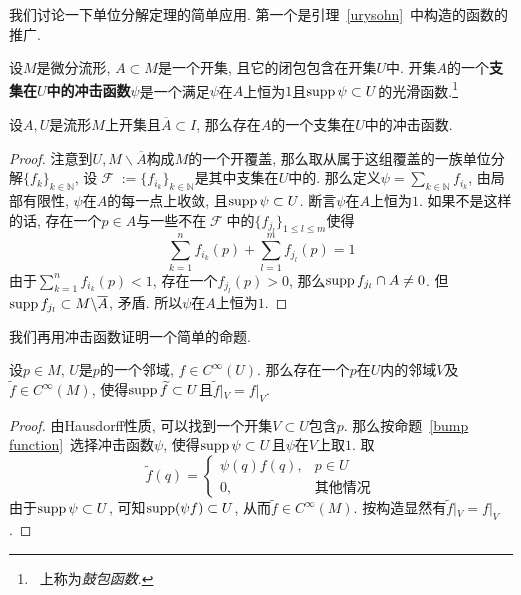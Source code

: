 我们讨论一下单位分解定理的简单应用.
第一个是引理~\ref{urysohn}~中构造的函数的推广.
\begin{defn}
    设$M$是微分流形, $A\subset M$是一个开集, 且它的闭包包含在开集$U$中.
    开集$A$的一个\textbf{支集在$U$中的冲击函数}$\psi$是一个满足$\psi$在$A$上恒为$1$且$\operatorname{supp}\psi\subset U$的光滑函数.\footnote{\parencite{Mei_Manifold}~上称为\textit{鼓包函数}.}
\end{defn}

\begin{prop}\label{bump function}
    设$A, U$是流形$M$上开集且$\overline{A}\subset I$, 那么存在$A$的一个支集在$U$中的冲击函数.
\end{prop}
\begin{proof}
    注意到$U,M\backslash\overline{A}$构成$M$的一个开覆盖, 那么取从属于这组覆盖的一族单位分解$\{f_k\}_{k\in\mathbb{N}}$,
    设$\mscrF:=\{f_{i_k}\}_{k\in\mathbb{N}}$是其中支集在$U$中的.
    那么定义$\displaystyle\psi=\sum_{k\in\mathbb{N}}f_{i_k}$, 由局部有限性, $\psi$在$A$的每一点上收敛, 且$\operatorname{supp}\psi\subset U$.
    断言$\psi$在$A$上恒为$1$.
    如果不是这样的话, 存在一个$p\in A$与一些不在$\mscrF$中的$\{f_{j_l}\}_{1\leq l \leq m}$使得
    \[\sum_{k=1}^nf_{i_k}(p)+\sum_{l=1}^mf_{j_l}(p)=1\]
    由于$\displaystyle\sum_{k=1}^nf_{i_k}(p)<1$, 存在一个$f_{j_l}(p)>0$, 那么$\operatorname{supp}{f_{j_l}}\cap A\neq 0$.
    但$\operatorname{supp}{f_{j_l}}\subset M\backslash\overline{A}$, 矛盾.
    所以$\psi$在$A$上恒为$1$.
\end{proof}

我们再用冲击函数证明一个简单的命题.
\begin{prop}[光滑函数扩张引理]\label{function extension}
    设$p\in M$, $U$是$p$的一个邻域, $f\in C^\infty(U)$.
    那么存在一个$p$在$U$内的邻域$V$及$\widetilde{f}\in C^\infty(M)$, 使得$\operatorname{supp}\widetilde{f}\subset U$且$\widetilde{f}|_V=f|_V$.
\end{prop}

\begin{proof}
    由Hausdorff性质, 可以找到一个开集$V\subset U$包含$p$.
    那么按命题~\ref{bump function}~选择冲击函数$\psi$, 使得$\operatorname{supp}\psi\subset U$且$\psi$在$V$上取$1$.
    取
    \[\widetilde{f}(q)=\begin{cases}
        \psi(q)f(q), & p\in U\\
        0, & \text{其他情况}
    \end{cases}\]
    由于$\operatorname{supp}\psi\subset U$, 可知$\operatorname{supp}(\psi f)\subset U$, 从而$\widetilde{f}\in C^\infty(M)$.
    按构造显然有$\widetilde{f}|_V=f|_V$.
\end{proof}

